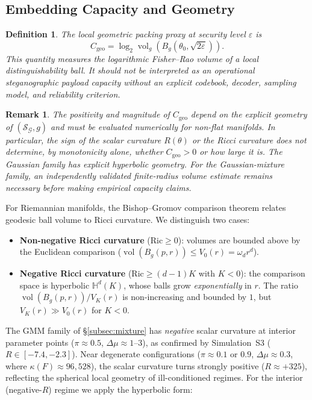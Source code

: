 \documentclass[a4paper,fleqn]{cas-dc}
\newtheorem{definition}{Definition}
\newtheorem{remark}{Remark}
\DeclareMathOperator{\vol}{vol}
\begin{document}
\subsection{Embedding Capacity and Geometry}
\label{sec:capacity}

\begin{definition}
  \label{def:geometric_capacity}
  The \emph{local geometric packing proxy} at security level $\varepsilon$
  is
  \[
  C_{\mathrm{geo}}
  =
  \log_2 \vol_g\!\left(B_g(\theta_0,\sqrt{2\varepsilon})\right).
  \]
  This quantity measures the logarithmic Fisher--Rao volume of a local
  distinguishability ball. It should not be interpreted as an operational
  steganographic payload capacity without an explicit codebook, decoder,
  sampling model, and reliability criterion.
\end{definition}
\begin{remark}%
  \label{rem:capacity_evaluation}
  The positivity and magnitude of $C_{\mathrm{geo}}$ depend on the explicit
  geometry of $(\mathcal{S}_{\mathcal{G}},g)$ and must be evaluated
  numerically for non-flat manifolds.
  In particular, the sign of the scalar curvature $R(\theta)$ or the Ricci
  curvature does not determine, by monotonicity alone, whether
  $C_{\mathrm{geo}}>0$ or how large it is.
  The Gaussian family has explicit hyperbolic geometry. For the
  Gaussian-mixture family, an independently validated finite-radius
  volume estimate remains necessary before making empirical capacity
  claims.
\end{remark}
For Riemannian manifolds, the Bishop--Gromov comparison theorem relates
geodesic ball volume to Ricci curvature.  We distinguish two cases:
\begin{itemize}
  \item \textbf{Non-negative Ricci curvature} ($\mathrm{Ric} \geq 0$):
        volumes are bounded above by the Euclidean comparison
        ($\vol(B_g(p,r)) \leq V_0(r) = \omega_d r^d$).
  \item \textbf{Negative Ricci curvature}
        ($\mathrm{Ric} \geq (d-1)K$ with $K < 0$):
        the comparison space is hyperbolic $\mathbb{H}^d(K)$, whose
        balls grow \emph{exponentially} in $r$.  The ratio
        $\vol(B_g(p,r)) / V_K(r)$ is non-increasing and bounded by $1$,
        but $V_K(r) \gg V_0(r)$ for $K < 0$.
\end{itemize}
The GMM family of \S\ref{subsec:mixture} has \emph{negative} scalar
curvature at interior parameter points ($\pi\approx 0.5$,
$\Delta\mu\approx 1$--$3$), as confirmed by Simulation~S3
($R\in[-7.4,-2.3]$).
Near degenerate configurations ($\pi\approx 0.1$ or $0.9$,
$\Delta\mu\approx 0.3$, where $\kappa(F)\approx 96{,}528$),
the scalar curvature turns strongly positive ($R\approx +325$),
reflecting the spherical local geometry of ill-conditioned regimes.
For the interior (negative-$R$) regime we apply the hyperbolic form:
\end{document}
